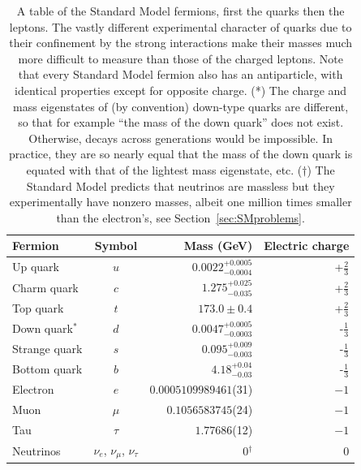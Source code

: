  \renewcommand{\arraystretch}{1.2}
  \begin{table}
    \centering
    \begin{tabular}{l c r r}
      Fermion             & Symbol & Mass (GeV) \cite{pdg} & Electric charge \\
      \hline
      Up quark            & $u$    & $0.0022^{+0.0005}_{-0.0004}$      & +$\frac{2}{3}$  \\
      Charm quark         & $c$    & $1.275^{+0.025}_{-0.035}$       & +$\frac{2}{3}$  \\
      Top quark           & $t$    & $173.0 \pm 0.4$       & +$\frac{2}{3}$  \\
      Down quark$^*$      & $d$    & $0.0047^{+0.0005}_{-0.0003}$      & -$\frac{1}{3}$  \\
      Strange quark       & $s$    & $0.095^{+0.009}_{-0.003}$       & -$\frac{1}{3}$  \\
      Bottom quark        & $b$    & $4.18^{+0.04}_{-0.03}$       & -$\frac{1}{3}$  \\
      \hline
      Electron            & $e$    & $0.0005109989461$(31) & $-1$ \\
      Muon                & $\mu$    & $0.1056583745$(24)  & $-1$ \\
      Tau                 & $\tau$    & $1.77686$(12)  & $-1$ \\
      Neutrinos           & $\nu_{e}$, $\nu_{\mu}$, $\nu_{\tau}$ & 0$^{\dagger}$ & 0 \\
    \end{tabular}
    \caption[Table of Standard Model fermions.]
    {A table of the Standard Model fermions, first the quarks then the leptons.
      The vastly different experimental character of quarks due to their confinement by the strong interactions make their masses much more difficult to measure than those of the charged leptons.
      Note that every Standard Model fermion also has an antiparticle, with identical properties except for opposite charge.
      (*) The charge and mass eigenstates of (by convention) down-type quarks are different, so that for example ``the mass of the down quark'' does not exist. Otherwise, decays across generations would be impossible. In practice, they are so nearly equal that the mass of the down quark is equated with that of the lightest mass eigenstate, etc.
      ($\dagger$) The Standard Model predicts that neutrinos are massless but they experimentally have nonzero masses, albeit one million times smaller than the electron's, see Section~\ref{sec:SMproblems}.
}
            \label{tab:fermions}
  \end{table}
  \renewcommand{\arraystretch}{1}


